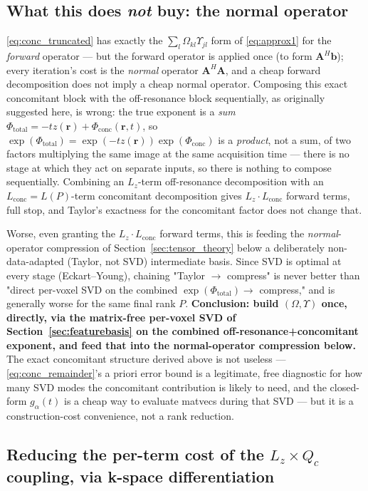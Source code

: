 \documentclass{article}
\begin{document}
\subsection{What this does \emph{not} buy: the normal operator}

\eqref{eq:conc_truncated} has exactly the $\sum_l \Omega_{kl}\Upsilon_{jl}$ form of
\eqref{eq:approx1} for the \emph{forward} operator — but the forward operator is applied once
(to form $\mathbf{A}^H\mathbf{b}$); every iteration's cost is the \emph{normal} operator
$\mathbf{A}^H\mathbf{A}$, and a cheap forward decomposition does not imply a cheap normal
operator. Composing this exact concomitant block with the off-resonance block sequentially, as
originally suggested here, is wrong: the true exponent is a \emph{sum}
$\Phi_{\mathrm{total}}=-tz(\mathbf{r})+\Phi_{\mathrm{conc}}(\mathbf{r},t)$, so
$\exp(\Phi_{\mathrm{total}})=\exp(-tz(\mathbf{r}))\exp(\Phi_{\mathrm{conc}})$ is a
\emph{product}, not a sum, of two factors multiplying the same image at the same acquisition
time — there is no stage at which they act on separate inputs, so there is nothing to compose
sequentially. Combining an $L_z$-term off-resonance decomposition with an $L_{\mathrm{conc}}=L(P)$-term
concomitant decomposition gives $L_z\cdot L_{\mathrm{conc}}$ forward terms, full stop, and Taylor's
exactness for the concomitant factor does not change that.

Worse, even granting the $L_z\cdot L_{\mathrm{conc}}$ forward terms, this is feeding the
\emph{normal}-operator compression of Section~\ref{sec:tensor_theory} below a deliberately
non-data-adapted (Taylor, not SVD) intermediate basis. Since SVD is optimal at every stage
(Eckart--Young), chaining "Taylor $\to$ compress" is never better than "direct per-voxel SVD on
the combined $\exp(\Phi_{\mathrm{total}})\to$ compress," and is generally worse for the same
final rank $P$. \textbf{Conclusion: build $(\Omega,\Upsilon)$ once, directly, via the matrix-free
per-voxel SVD of Section~\ref{sec:featurebasis} on the combined off-resonance+concomitant
exponent, and feed that into the normal-operator compression below.} The exact concomitant
structure derived above is not useless — \eqref{eq:conc_remainder}'s a priori error bound is a
legitimate, free diagnostic for how many SVD modes the concomitant contribution is likely to
need, and the closed-form $g_\alpha(t)$ is a cheap way to evaluate matvecs during that SVD — but
it is a construction-cost convenience, not a rank reduction.

\subsection{Reducing the per-term cost of the $L_z\times Q_c$ coupling, via k-space differentiation}
\label{sec:conc_kspace_deriv}
\end{document}
